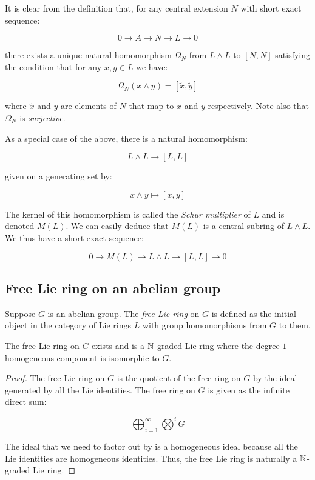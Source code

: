 It is clear from the definition that, for any central
extension $N$ with short exact sequence:

$$0 \to A \to N \to L \to 0$$

there exists a unique natural homomorphism $\Omega_N$ from $L \wedge L$ to
$[N,N]$ satisfying the condition that for any $x,y \in L$ we have:

$$\Omega_N(x \wedge y) = [\tilde{x},\tilde{y}]$$

where $\tilde{x}$ and $\tilde{y}$ are elements of $N$ that map to $x$
and $y$ respectively. Note also that $\Omega_N$ is {\em surjective}.

As a special case of the above, there is a natural homomorphism:

$$L \wedge L \to [L,L]$$

given on a generating set by:

$$x \wedge y \mapsto [x,y]$$

The kernel of this homomorphism is called the {\em Schur multiplier}
of $L$ and is denoted $M(L)$. We can easily deduce that $M(L)$ is a
central subring of $L \wedge L$. We thus have a short exact sequence:

$$0 \to M(L) \to L \wedge L \to [L,L] \to 0$$

\subsection{Free Lie ring on an abelian group}\label{sec:free-lie-ring-on-abelian-group}

Suppose $G$ is an abelian group. The {\em free Lie ring} on $G$ is
defined as the initial object in the category of Lie rings $L$ with
group homomorphisms from $G$ to them.

\begin{lemma}
  The free Lie ring on $G$ exists and is a $\mathbb{N}$-graded Lie ring where
  the degree $1$ homogeneous component is isomorphic to $G$.
\end{lemma}

\begin{proof}
  The free Lie ring on $G$ is the quotient of the free ring on $G$ by
  the ideal generated by all the Lie identities. The free ring on $G$
  is given as the infinite direct sum:

  $$\bigoplus_{i=1}^\infty \bigotimes^iG$$

  The ideal that we need to factor out by is a homogeneous ideal
  because all the Lie identities are homogeneous identities. Thus, the
  free Lie ring is naturally a $\mathbb{N}$-graded Lie ring.
\end{proof}

